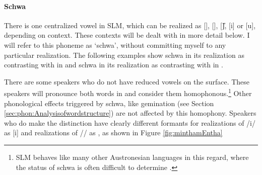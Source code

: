 % 

% 
% 
% 
% 



\paragraph{Schwa}
There is one centralized vowel in SLM, which can be realized as [\E], [\I], [\U], [i] or [u], depending on context. These contexts will be dealt with in more detail below. I will refer to this phoneme as `schwa', without committing myself to any particular realization. The following examples show schwa in its realization as  contrasting with  in  and schwa in its realization as  contrasting with  in .



There are some speakers who do not have reduced vowels on the surface. These speakers will pronounce both words in   and consider them homophonous.\footnote{SLM
 behaves like many other Austronesian languages in this regard, where the status of schwa is often difficult to determine \citep[116]{Himmelmann2005typochar}.}
Other phonological effects triggered by schwa, like gemination (see Section \ref{sec:phon:Analysisofwordstructure}) are not affected by this homophony.
Speakers who do make the distinction have clearly different formants for realizations of /i/ as [i] and realizations of /\E/ as , as shown in Figure \ref{fig:minthamEntha}

